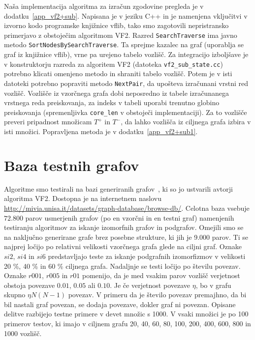 \documentclass[a4paper, 12pt, ]{book}
\begin{document}
	Naša implementacija algoritma za izračun zgodovine pregleda je v dodatku~\ref{app_vf2+sub}. Napisana je v jeziku C++ in je namenjena vključitvi v
	izvorno kodo programske knjižnice vflib, tako smo zagotovili nepristransko primerjavo z obstoječim algoritmom VF2. Razred \texttt{SearchTraverse} ima
	javno metodo \texttt{Sort\-Nodes\-By\-Search\-Traverse}. Ta sprejme
	kazalec na graf (uporablja se graf iz knjižnice vflib), vrne pa urejeno tabelo vozlišč. Za integracijo izboljšave je v konstruktorju razreda za algoritem VF2
	(datoteka \texttt{vf2\_sub\_state.cc}) potrebno klicati omenjeno metodo in shraniti tabelo vozlišč. Potem je v isti datoteki potrebno popraviti metodo
	\texttt{NextPair}, da upošteva izračunani vrstni red vozlišč. Vozlišče iz vzorčnega grafa dobi neposredno iz tabele izračunanega vrstnega reda 
	preiskovanja, za indeks v tabeli uporabi trenutno globino preiskovanja (spremenljivka \texttt{core\_len} v obstoječi implementaciji). Za to vozlišče preveri
	pripadnost množicam $T^+$ in $T^-$, da lahko vozlišča iz ciljnega grafa izbira v isti množici. Popravljena metoda je v dodatku~\ref{app_vf2+sub1}.
	
	
	\section{Baza testnih grafov}
	Algoritme smo testirali na bazi generiranih grafov~\cite{database}, ki so jo ustvarili avtorji algoritma VF2. Dostopna je na internetnem naslovu
	\href{http://mivia.unisa.it/datasets/graph-database/browse-db/}
	{http://mivia.unisa.it/{\allowbreak}datasets/{\allowbreak}graph-database/browse-db/}. Celotna baza vsebuje 	
	$72.800$ parov usmerjenih grafov (po en vzorčni in
	en testni graf) namenjenih testiranju algoritmov za iskanje izomorfnih grafov in podgrafov. Omejili smo se na naključno generirane grafe brez posebne
	strukture, ki jih je 9.000 parov. Ti se najprej ločijo po relativni velikosti vzorčnega grafa glede na ciljni graf. Oznake $si2$, $si4$ in $si6$ predstavljajo
	teste za iskanje podgrafnih izomorfizmov v velikosti 20 \%, 40 \% in 60 \% ciljnega grafa. Nadaljnje se testi ločijo po številu povezav. Oznake $r001$,
	$r005$ in $r01$ pomenijo, da je med vsakim parov vozlišč verjetnost obstoja povezave $0.01$, $0.05$ ali $0.10$. Je če verjetnost povezave $\eta$,
	bo v grafu skupno $\eta N (N-1)$ povezav. V primeru da je število povezav premajhno, da bi bil nastali graf povezan, se dodaja povezave, dokler graf ni 
	povezan. Opisane delitve razbijejo testne primere v devet množic s 1000. V vsaki množici je po 100 primerov testov, ki imajo v ciljnem grafu 20, 40, 60, 	
	80, 100, 200, 400, 600, 800 in 1000 vozlišč.
\end{document}
